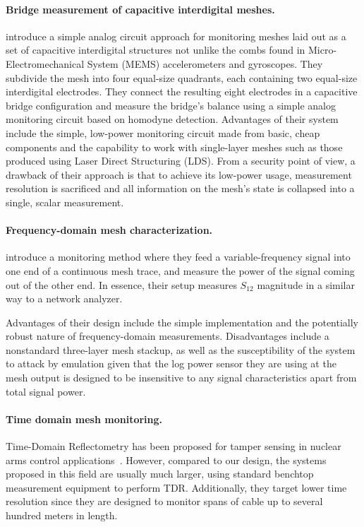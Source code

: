 \documentclass[final]{iacrtrans}
\begin{document}
\paragraph{Bridge measurement of capacitive interdigital meshes.} \textcite{dupontMiniaturizedUltraLowPowerTamper2022}
introduce a simple analog circuit approach for monitoring meshes laid out as a set of capacitive interdigital structures
not unlike the combs found in Micro-Electromechanical System (MEMS) accelerometers and gyroscopes. They subdivide the
mesh into four equal-size quadrants, each containing two equal-size interdigital electrodes. They connect the resulting
eight electrodes in a capacitive bridge configuration and measure the bridge's balance using a simple analog monitoring
circuit based on homodyne detection. Advantages of their system include the simple, low-power monitoring circuit made
from basic, cheap components and the capability to work with single-layer meshes such as those produced using Laser
Direct Structuring (LDS). From a security point of view, a drawback of their approach is that to achieve its low-power
usage, measurement resolution is sacrificed and all information on the mesh's state is collapsed into a single, scalar
measurement.

\paragraph{Frequency-domain mesh characterization.}
\textcite{vasileProtectingSecretsAdvanced2019} introduce a monitoring method where they feed a variable-frequency signal
into one end of a continuous mesh trace, and measure the power of the signal coming out of the other end. In essence,
their setup measures $S_{12}$ magnitude in a similar way to a network analyzer.

Advantages of their design include the simple implementation and the potentially robust nature of frequency-domain
measurements. Disadvantages include a nonstandard three-layer mesh stackup, as well as the susceptibility of the system
to attack by emulation given that the log power sensor they are using at the mesh output is designed to be insensitive
to any signal characteristics apart from total signal power.

\paragraph{Time domain mesh monitoring.}
Time-Domain Reflectometry has been proposed for tamper sensing in nuclear arms control
applications~\cite{parsonsTamperRadiationResistant1977}. However, compared to our design, the systems proposed in this
field are usually much larger, using standard benchtop measurement equipment to perform TDR. Additionally, they target
lower time resolution since they are designed to monitor spans of cable up to several hundred meters in length.
\end{document}
